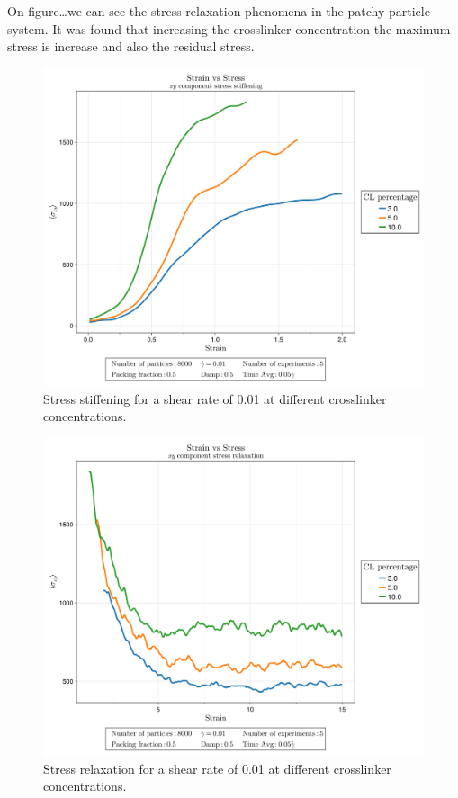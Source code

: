 On figure\ldots we can see the stress relaxation phenomena in the patchy particle system.
It was found that increasing the crosslinker concentration the maximum stress is increase and also the residual stress.

\newpage


\begin{figure}[ht!]
    \centering
    \includegraphics[width=\textwidth]{figs/ComputaitonalResults/stiff_dgamma10Stress.png}
    \caption{Stress stiffening for a shear rate of \num{0.01} at different crosslinker concentrations.}
\end{figure}

\begin{figure}[ht!]
    \centering
    \includegraphics[width=\textwidth]{figs/ComputaitonalResults/srlx_dgamma10Stress.png}
    \caption{Stress relaxation for a shear rate of \num{0.01} at different crosslinker concentrations.}
\end{figure}



